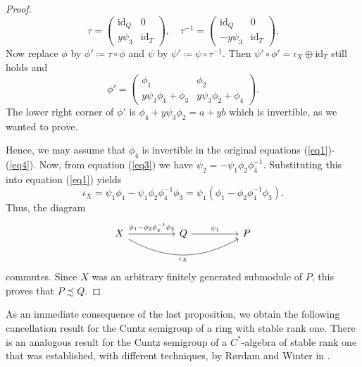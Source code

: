 \documentclass[11pt]{amsart}
\numberwithin{equation}{section}
\theoremstyle{definition}
\theoremstyle{plain}
\theoremstyle{definition}
\begin{document}
\begin{proof}
\begin{equation*}
    \tau = \begin{pmatrix}
        \mathrm{id}_Q & 0 \\
        y\psi_3 & \mathrm{id}_T 
    \end{pmatrix}, \quad \tau^{-1} =  \begin{pmatrix}
        \mathrm{id}_Q & 0 \\
        -y\psi_3 & \mathrm{id}_T
    \end{pmatrix}. 
\end{equation*}
Now replace $\phi$ by $\phi' \coloneqq \tau \circ \phi$ and $\psi$ by $\psi' \coloneqq \psi \circ \tau^{-1}$. Then $\psi' \circ \phi' = \iota_{X} \oplus \mathrm{id}_T$ still holds and 
\begin{equation*}
    \phi' = \begin{pmatrix}
        \phi_1 & \phi_2 \\
        y\psi_3\phi_1 + \phi_3 & y\psi_3\phi_2 + \phi_4 
    \end{pmatrix}.
\end{equation*}
The lower right corner of $\phi'$ is $\phi_4 + y\psi_3\phi_2 = a + yb$ which is invertible, as we wanted to prove. 

Hence, we may assume that $\phi_4$ is invertible in the original equations (\ref{eq1})-(\ref{eq4}). Now, from equation (\ref{eq3}) we have $\psi_2 = - \psi_1\phi_2\phi_4^{-1}$. Substituting this into equation (\ref{eq1}) yields
\begin{equation*}
    \iota_X = \psi_1\phi_1 - \psi_1\phi_2\phi_4^{-1}\phi_3 = \psi_1(\phi_1 - \phi_2\phi_4^{-1}\phi_3).
\end{equation*}
Thus, the diagram
\begin{equation*}
\begin{tikzcd}[column sep=huge]
X \arrow[r, "\phi_1 - \phi_2\phi_4^{-1}\phi_3"] \arrow[rr, bend right=30, "\iota_X"'] & Q \arrow[r, "\psi_1"] & P
\end{tikzcd}
\end{equation*}
commutes. Since $X$ was an arbitrary finitely generated submodule of $P$, this proves that $P \precsim Q$.
\end{proof}

As an immediate consequence of the last proposition, we obtain the following cancellation result for the Cuntz semigroup of a ring with stable rank one. There is an analogous result for the Cuntz semigroup of a $C^*$-algebra of stable rank one that was established, with different techniques, by R\o rdam and Winter in \cite[Proposition 4.1]{RorWin10ZRevisited}. 
\end{document}
